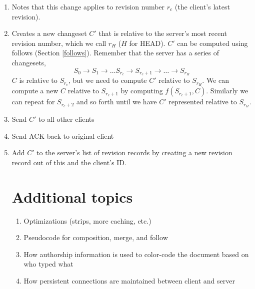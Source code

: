 \documentclass{article}
\begin{document}
\begin{enumerate}
\item Notes that this change applies to revision number
  $r_c$ (the client's latest revision).
\item Creates a new changeset $C'$ that is relative to the
  server's most recent revision number, which we call
  $r_H$ ($H$ for HEAD).  $C'$ can be computed using
  follows (Section \ref{follows}).  Remember that the server has a series of
  changesets,
$$S_0\rightarrow S_1\rightarrow \ldots S_{r_c}\rightarrow S_{r_c+1} \rightarrow \ldots \rightarrow S_{r_H} $$
$C$ is relative to $S_{r_c}$, but we need to compute $C'$ relative to $S_{r_H}$.
We can compute a new $C$ relative to $S_{r_c+1}$ by computing $f(S_{r_c+1},C)$.  Similarly we can repeat for
$S_{r_c+2}$ and so forth until we have $C'$ represented relative to $S_{r_H}$.
\item Send $C'$ to all other clients
\item Send ACK back to original client
\item Add $C'$ to the server's list of revision records by creating a new revision record out of this and the client's ID.

\appendix

\section*{Additional topics}
\begin{enumerate}
\item Optimizations (strips, more caching, etc.)
\item Pseudocode for composition, merge, and follow
\item How authorship information is used to color-code the document based on who typed what
\item How persistent connections are maintained between client and server
\end{enumerate}
\end{enumerate}
\end{document}
